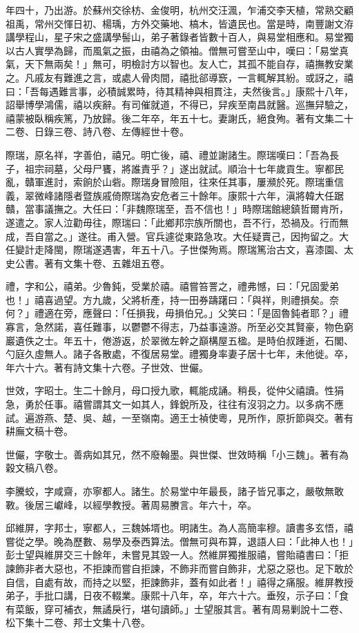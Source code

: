 \begin{pinyinscope}
年四十，乃出游。於蘇州交徐枋、金俊明，杭州交汪渢，乍浦交李天植，常熟交顧祖禹，常州交惲日初、楊瑀，方外交藥地、槁木，皆遺民也。當是時，南豐謝文洊講學程山，星子宋之盛講學髻山，弟子著錄者皆數十百人，與易堂相應和。易堂獨以古人實學為歸，而風氣之振，由禧為之領袖。僧無可嘗至山中，嘆曰：「易堂真氣，天下無兩矣！」無可，明檢討方以智也。友人亡，其孤不能自存，禧撫教安業之。凡戚友有難進之言，或處人骨肉間，禧批郤導窾，一言輒解其紛。或訝之，禧曰：「吾每遇難言事，必積誠累時，待其精神與相貫注，夫然後言。」康熙十八年，詔舉博學鴻儒，禧以疾辭。有司催就道，不得已，舁疾至南昌就醫。巡撫舁驗之，禧蒙被臥稱疾篤，乃放歸。後二年卒，年五十七。妻謝氏，絕食殉。著有文集二十二卷、日錄三卷、詩八卷、左傳經世十卷。

際瑞，原名祥，字善伯，禧兄。明亡後，禧、禮並謝諸生。際瑞嘆曰：「吾為長子，祖宗祠墓，父母尸饔，將誰責乎？」遂出就試。順治十七年歲貢生。寧都民亂，贛軍進討，索餉於山砦。際瑞身冒險阻，往來任其事，屢瀕於死。際瑞重信義，翠微峰諸隱者暨族戚倚際瑞為安危者三十餘年。康熙十六年，滇將韓大任踞贛，當事議撫之。大任曰：「非魏際瑞至，吾不信也！」時際瑞館總鎮哲爾肯所，遂遣之。家人泣勸毋往，際瑞曰：「此鄉邦宗族所關也，吾不行，恐禍及。行而無成，吾自當之。」遂往。甫入營。官兵遽從東路急攻。大任疑賣己，因拘留之。大任變計走降閩，際瑞遂遇害，年五十八。子世傑殉焉。際瑞篤治古文，喜漆園、太史公書。著有文集十卷、五雜俎五卷。

禮，字和公，禧弟。少魯鈍，受業於禧。禧嘗笞詈之，禮弗憾，曰：「兄固愛弟也！」禧喜過望。方九歲，父將析產，持一田券躊躇曰：「與祥，則禮損矣。奈何？」禮適在旁，應聲曰：「任損我，毋損伯兄。」父笑曰：「是固魯鈍者耶？」禮寡言，急然諾，喜任難事，以鬱鬱不得志，乃益事遠游。所至必交其賢豪，物色窮巖遺佚之士。年五十，倦游返，於翠微左幹之巔構屋五楹。是時伯叔踵逝，石閣、勺庭久虛無人。諸子各散處，不復居易堂。禮獨身率妻子居十七年，未他徙。卒，年六十六。著有詩文集十六卷。子世效、世儼。

世效，字昭士。生二十餘月，母口授九歌，輒能成誦。稍長，從仲父禧讀。性狷急，勇於任事。禧嘗謂其文一如其人，鋒銳所及，往往有沒羽之力。以多病不應試。遍游燕、楚、吳、越，一至嶺南。適王士禎使粵，見所作，原折節與交。著有耕廡文稿十卷。

世儼，字敬士。善病如其兄，然不廢翰墨。與世傑、世效時稱「小三魏」。著有為穀文稿八卷。

李騰蛟，字咸齋，亦寧都人。諸生。於易堂中年最長，諸子皆兄事之，嚴敬無敢斁。後居三巘峰，以經學教授。著周易賸言。年六十，卒。

邱維屏，字邦士，寧都人，三魏姊壻也。明諸生。為人高簡率穆。讀書多玄悟，禧嘗從之學。晚為歷數、易學及泰西算法。僧無可與布算，退語人曰：「此神人也！」彭士望與維屏交三十餘年，未嘗見其毀一人。然維屏獨推服禧，嘗貽禧書曰：「拒諫飾非者大惡也，不拒諫而嘗自拒諫，不飾非而嘗自飾非，尤惡之惡也。足下敢於自信，自處有故，而持之以堅，拒諫飾非，蓋有如此者！」禧得之痛服。維屏教授弟子，手批口講，日夜不輟業。康熙十八年，卒，年六十六。垂歿，示子曰：「食有菜飯，穿可補衣，無譎戾行，堪句讀師。」士望服其言。著有周易剿說十二卷、松下集十二卷、邦士文集十八卷。


\end{pinyinscope}
